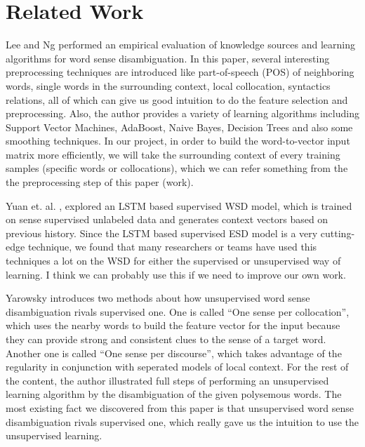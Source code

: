 \documentclass[11pt,letterpaper]{article}
\begin{document}
\section{Related Work}
Lee and Ng  performed an empirical evaluation of knowledge sources and learning algorithms for word sense disambiguation. In this paper, several interesting preprocessing techniques are introduced like part-of-speech (POS) of neighboring words, single words in the surrounding context, local collocation, syntactics relations, all of which can give us good intuition to do the feature selection and preprocessing. Also, the author provides a variety of learning algorithms including Support Vector Machines, AdaBoost, Naive Bayes, Decision Trees and also some smoothing techniques. In our project, in order to build the word-to-vector input matrix more efficiently, we will take the surrounding context of every training samples (specific words or collocations), which we can refer something from the the preprocessing step of this paper (work).

Yuan et. al. , explored an LSTM based supervised WSD model, which is trained on sense supervised unlabeled data and generates context vectors based on previous history. Since the LSTM based supervised ESD model is a very cutting-edge technique, we found that many researchers or teams have used this techniques a lot on the WSD for either the supervised or unsupervised way of learning. I think we can probably use this if we need to improve our own work.

Yarowsky  introduces two methods about how unsupervised word sense disambiguation rivals supervised one. One is called “One sense per collocation”, which uses the nearby words to build the feature vector for the input because they can provide strong and consistent clues to the sense of a target word. Another one is called “One sense per discourse”, which takes advantage of the regularity in conjunction with seperated models of local context. For the rest of the content, the author illustrated full steps of performing an unsupervised learning algorithm by the disambiguation of the given polysemous words. The most existing fact we discovered from this paper is that unsupervised word sense disambiguation rivals supervised one, which really gave us the intuition to use the unsupervised learning.
\end{document}
